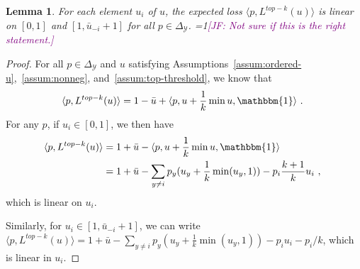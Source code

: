 \documentclass[12pt]{article}
\newcommand{\Comments}{1}
\newcommand{\mynote}[2]{\ifnum\Comments=1\textcolor{#1}{#2}\fi}
\newcommand{\jessie}[1]{\mynote{purple}{[JF: #1]}}
\newcommand{\simplex}{\Delta_\Y}
\newcommand{\Y}{\mathcal{Y}}
\newcommand{\inprod}[2]{\langle #1, #2 \rangle}%
\newcommand{\ones}{\mathbbm{1}}
\newtheorem{lemma}{Lemma}
\begin{document}
\begin{lemma}\label{lem:linear-pieces}
	For each element $u_i$ of $u$, the expected loss $\inprod{p}{L^{top-k}(u)}$ is linear on $[0,1]$ and $[1, \bar u_{-i} + 1]$ for all $p \in \simplex$.
	\jessie{Not sure if this is the right statement.}	
\end{lemma}
\begin{proof}
	For all $p \in \simplex$ and $u$ satisfying Assumptions~\ref{assum:ordered-u},~\ref{assum:nonneg}, and~\ref{assum:top-threshold}, we know that 
	\begin{equation}
	\inprod{p}{L^{top-k}(u)} = 1 - \bar u + \inprod{p}{u + \frac 1 k \min{u,\ones}}~.~
	\end{equation}
	For any $p$, if $u_i \in [0,1]$, we then have 
	\begin{align*}
	\inprod{p}{L^{top-k}(u)} &= 1 + \bar u - \inprod{p}{u + \frac 1 k \min{u,\ones}}\\
	 &= 1 + \bar u - \sum_{y \neq i}p_y (u_y + \frac 1 k \min(u_y, 1)) - p_i \frac {k+1} k u_i~,~
	\end{align*}
	which is linear on $u_i$.
	
	Similarly, for $u_i \in [1, \bar u_{-i} + 1]$, we can write $\inprod{p}{L^{top-k}(u)} = 1 + \bar u - \sum_{y \neq i}p_y (u_y + \frac 1 k \min(u_y, 1)) - p_i u_i - p_i/k$, which is linear in $u_i$.
\end{proof}
\end{document}
